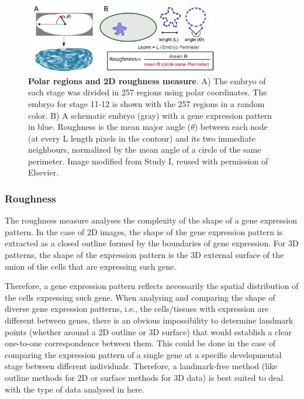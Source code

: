 
\begin{figure}[h]
  \includegraphics[width=0.75\textwidth]{./Images/roughness_regions.png}
  \centering
  \caption{\textbf{Polar regions and 2D roughness measure}. A) The embryo of each stage was divided in 257 regions using polar coordinates. The embryo for stage 11-12 is shown with the 257 regions in a random color. B) A schematic embryo (gray) with a gene expression pattern in blue. Roughness is the mean major angle ($\theta$) between each node (at every L length pixels in the contour) and its two immediate neighbours, normalized by the mean angle of a circle of the same perimeter. Image modified from Study I, reused with permission of Elsevier.
   }
  \label{fig:roughness_regions}
\end{figure}

\subsubsection{Roughness}
\label{Methods_roughness}
The roughness measure analyses the complexity of the shape of a gene expression pattern. In the case of 2D images, the shape of the gene expression pattern is extracted as a closed outline formed by the boundaries of gene expression. For 3D patterns, the shape of the expression pattern is the 3D external surface of the union of the cells that are expressing such gene.

Therefore, a gene expression pattern reflects necessarily the spatial distribution of the cells expressing such gene. When analysing and comparing the shape of diverse gene expression patterns, i.e., the cells/tissues with expression are different between genes, there is an obvious impossibility to determine landmark points (whether around a 2D outline or 3D surface) that would establish a clear one-to-one correspondence between them. This could be done in the case of comparing the expression pattern of a single gene at a specific developmental stage between different individuals.
Therefore, a landmark-free method (like outline methods for 2D or surface methods for 3D data) is best suited to deal with the type of data analysed in here.

